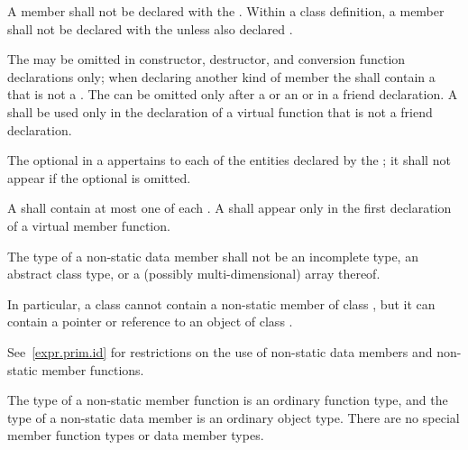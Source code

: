 \pnum
A member shall not be declared with the 
. Within a class definition, a member shall not be declared with the   unless also declared .

\pnum
The  may be omitted in constructor, destructor,
and conversion function declarations only;
when declaring another kind of member the 
shall contain a  that is not a .
The
 can be omitted only after a
 or an  or in a
friend declaration. A
 shall be used only in the declaration of a
virtual function
that is not a friend declaration.

\pnum
The optional  in a 
appertains to each of the entities declared by the ;
it shall not appear if the optional  is omitted.

\pnum
A  shall contain at most one of each
.
A 
shall appear only in the first declaration of a virtual member
function.

\pnum
{}%
The type of a non-static data member shall not be an
incomplete type,
an abstract class type,
or a (possibly multi-dimensional) array thereof.
\begin{note}
In particular, a class  cannot contain
a non-static member of class ,
but it can contain a pointer or reference to an object of class .
\end{note}

\pnum
\begin{note}
See~\ref{expr.prim.id} for restrictions on the use of non-static data
members and non-static member functions.
\end{note}

\pnum
\begin{note}
The type of a non-static member function is an ordinary function type,
and the type of a non-static data member is an ordinary object type.
There are no special member function types or data member types.
\end{note}

